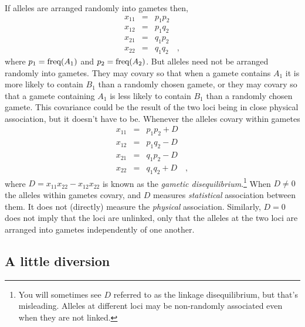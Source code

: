 \documentclass[12pt]{article}
\begin{document}
If alleles are arranged randomly into gametes then,
\begin{eqnarray*}
x_{11} &=& p_1p_2 \\
x_{12} &=& p_1q_2 \\
x_{21} &=& q_1p_2 \\
x_{22} &=& q_1q_2 \quad ,
\end{eqnarray*}
where $p_1 = \hbox{freq}(A_1)$ and $p_2 = \hbox{freq}(A_2)$. But
alleles need not be arranged randomly into gametes. They may covary so
that when a gamete contains $A_1$ it is more likely to contain $B_1$
than a randomly chosen gamete, or they may covary so that a gamete
containing $A_1$ is less likely to contain $B_1$ than a randomly
chosen gamete. This covariance could be the result of the two loci
being in close physical association, but it doesn't have to
be. Whenever the alleles covary within gametes
\begin{eqnarray*}
x_{11} &=& p_1p_2 + D \\
x_{12} &=& p_1q_2 - D \\
x_{21} &=& q_1p_2 - D \\
x_{22} &=& q_1q_2 + D \quad ,
\end{eqnarray*}
where $D = x_{11}x_{22} - x_{12}x_{22}$ is known as the {\it gametic
  disequilibrium}.\footnote{You will sometimes see $D$ referred to as
  the linkage disequilibrium, but that's misleading. Alleles at
  different loci may be non-randomly associated even when they are not
  linked.} When $D \ne 0$ the alleles within gametes covary, and $D$
measures {\it statistical\/} association between them. It does not
(directly) measure the {\it physical\/} association. Similarly, $D =
0$ does not imply that the loci are unlinked, only that the alleles at
the two loci are arranged into gametes independently of one
another.

\subsection*{A little diversion}
\end{document}
